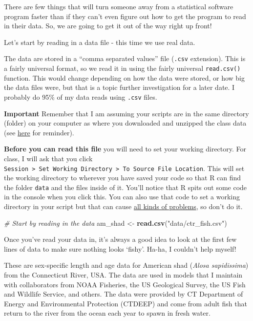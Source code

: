 \documentclass[
]{book}
\newenvironment{Shaded}{\begin{snugshade}}{\end{snugshade}}
\newcommand{\CommentTok}[1]{\textcolor[rgb]{0.56,0.35,0.01}{\textit{#1}}}
\newcommand{\KeywordTok}[1]{\textcolor[rgb]{0.13,0.29,0.53}{\textbf{#1}}}
\newcommand{\NormalTok}[1]{#1}
\newcommand{\StringTok}[1]{\textcolor[rgb]{0.31,0.60,0.02}{#1}}
\begin{document}
There are few things that will turn someone away from a statistical software program faster than if they can't even figure out how to get the program to read in their data. So, we are going to get it out of the way right up front!

Let's start by reading in a data file - this time we use real data.

The data are stored in a ``comma separated values'' file (\texttt{.csv} extension). This is a fairly universal format, so we read it in using the fairly universal \texttt{read.csv()} function. This would change depending on how the data were stored, or how big the data files were, but that is a topic further investigation for a later date. I probably do 95\% of my data reads using \texttt{.csv} files.

\textbf{Important} Remember that I am assuming your scripts are in the same directory (folder) on your computer as where you downloaded and unzipped the class data (see \href{https://danstich.github.io/stich/classes/BIOL217/software.html}{here} for reminder).

\textbf{Before you can read this file} you will need to set your working directory. For class, I will ask that you click \texttt{Session\ \textgreater{}\ Set\ Working\ Directory\ \textgreater{}\ To\ Source\ File\ Location}. This will set the working directory to wherever you have saved your code so that R can find the folder \texttt{data} and the files inside of it. You'll notice that R spits out some code in the console when you click this. You can also use that code to set a working directory in your script but that can cause \href{https://support.rstudio.com/hc/en-us/articles/200711843-Working-Directories-and-Workspaces}{all kinds of problems}, so don't do it.

\begin{Shaded}
\begin{Highlighting}[]
\CommentTok{# Start by reading in the data}
\NormalTok{am_shad <-}\StringTok{ }\KeywordTok{read.csv}\NormalTok{(}\StringTok{"data/ctr_fish.csv"}\NormalTok{)}
\end{Highlighting}
\end{Shaded}

Once you've read your data in, it's always a good idea to look at the first few lines of data to make sure nothing looks `fishy'. Ha-ha, I couldn't help myself!

These are sex-specific length and age data for American shad (\emph{Alosa sapidissima}) from the Connecticut River, USA. The data are used in models that I maintain with collaborators from NOAA Fisheries, the US Geological Survey, the US Fish and Wildlife Service, and others. The data were provided by CT Department of Energy and Environmental Protection (CTDEEP) and come from adult fish that return to the river from the ocean each year to spawn in fresh water.
\end{document}
